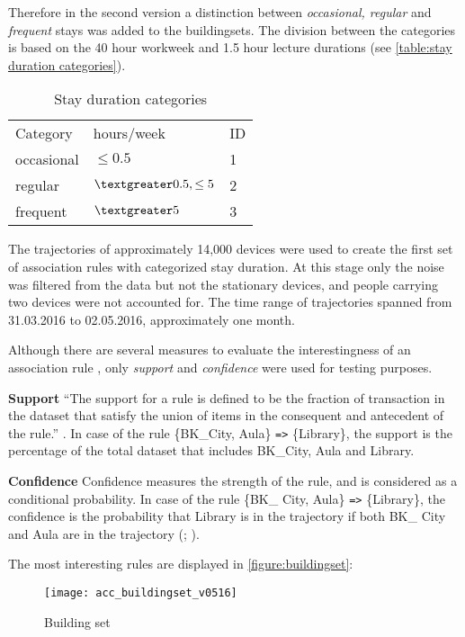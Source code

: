 Therefore in the second version a distinction between \textit{occasional,
regular} and \textit{frequent} stays was added to the buildingsets. The division
between the categories is based on the 40 hour workweek and 1.5 hour lecture
durations (see \autoref{table:stay duration categories}). 

\begin{table}[H]
\centering
\captionsetup{justification=centering}
\caption{Stay duration categories}
\label{table:stay duration categories}
\begin{tabular}{lll}
\cline{1-3}
Category   & hours/week           	& ID \\ \cline{1-3}
occasional & $\leq 0.5$             	& 1  \\
regular	& $\textgreater 0.5, \leq 5$ & 2  \\
frequent   & $\textgreater 5$       	& 3
\end{tabular}
\end{table}

The trajectories of approximately 14,000 devices were used to create the first set of association rules with categorized stay duration. At this stage only the noise was filtered from the data but not the stationary devices, and people carrying two devices were not accounted for. The time range of trajectories spanned from 31.03.2016 to 02.05.2016, approximately one month.

Although there are several measures to evaluate the interestingness of an association rule \cite{zhang_survey_2009}, only \textit{support} and \textit{confidence} were used for testing purposes. 

\textbf{Support}
“The support for a rule is defined to be the fraction of transaction in the dataset that satisfy the union of items in the consequent and antecedent of the rule.” \cite{agrawal_mining_1993}. In case of the rule \{BK\_City, Aula\} \verb|=>| \{Library\}, the support is the percentage of the total dataset that includes BK\_City, Aula and Library.

\textbf{Confidence}
Confidence measures the strength of the rule, and is considered as a conditional probability. In case of the rule \{BK\_ City, Aula\} \verb|=>| \{Library\}, the confidence is the probability that Library is in the trajectory if both BK\_ City and Aula are in the trajectory (\cite{agrawal_mining_1993}; \cite{anbukkarasy_interesting_2013}).

The most interesting rules are displayed in \autoref{figure:buildingset}:
\begin{figure}[H]
\centering
\texttt{[image: acc\_buildingset\_v0516]}
\captionsetup{justification=centering}
\caption{Building set}
\label{figure:buildingset}
\end{figure}

